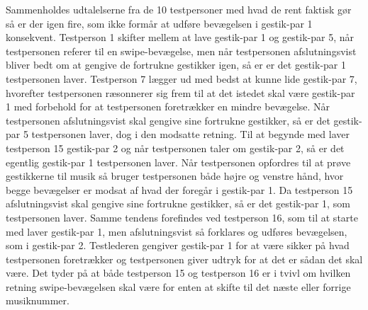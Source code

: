 Sammenholdes udtalelserne fra de 10 testpersoner med hvad de rent faktisk gør så er der igen fire, som ikke formår at udføre bevægelsen i gestik-par 1 konsekvent. Testperson 1 skifter mellem at lave gestik-par 1 og gestik-par 5, når testpersonen referer til en swipe-bevægelse, men når testpersonen afslutningsvist bliver bedt om at gengive de fortrukne gestikker igen, så er er det gestik-par 1 testpersonen laver. Testperson 7 lægger ud med bedst at kunne lide gestik-par 7, hvorefter testpersonen ræsonnerer sig frem til at det istedet skal være gestik-par 1 med forbehold for at testpersonen foretrækker en mindre bevægelse. Når testpersonen afslutningsvist skal gengive sine fortrukne gestikker, så er det gestik-par 5 testpersonen laver, dog i den modsatte retning. Til at begynde med laver testperson 15 gestik-par 2 og når testpersonen taler om gestik-par 2, så er det egentlig gestik-par 1 testpersonen laver. Når testpersonen opfordres til at prøve gestikkerne til musik så bruger testpersonen både højre og venstre hånd, hvor begge bevægelser er modsat af hvad der foregår i gestik-par 1. Da testperson 15 afslutningsvist skal gengive sine fortrukne gestikker, så er det gestik-par 1, som testpersonen laver. Samme tendens forefindes ved testperson 16, som til at starte med laver gestik-par 1, men afslutningsvist så forklares og udføres bevægelsen, som i gestik-par 2. Testlederen gengiver gestik-par 1 for at være sikker på hvad testpersonen foretrækker og testpersonen giver udtryk for at det er sådan det skal være. Det tyder på at både testperson 15 og testperson 16 er i tvivl om hvilken retning swipe-bevægelsen skal være for enten at skifte til det næste eller forrige musiknummer. 

